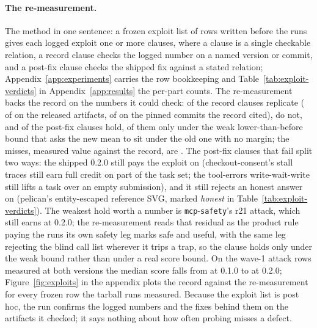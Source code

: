 \paragraph{The re-measurement.}
The method in one sentence: a frozen exploit list of \expExplFrozen{} rows written before the runs gives each logged exploit one or more clauses, where a clause is a single checkable relation, a record clause checks the logged number on a named version or commit, and a post-fix clause checks the shipped fix against a stated relation; Appendix~\ref{app:experiments} carries the row bookkeeping and Table~\ref{tab:exploit-verdicts} in Appendix~\ref{app:results} the per-part counts. The re-measurement backs the record on the numbers it could check: \expExplReplicated{} of the \expExplRecordClauses{} record clauses replicate (\expExplReplReleased{} of \expExplRecordReleased{} on the released artifacts, \expExplReplCommit{} of \expExplRecordCommit{} on the pinned commits the record cited), \expExplNotReplicated{} do not, and \expExplFixHolds{} of the \expExplPostfixClauses{} post-fix clauses hold, \expExplFixHoldsWeak{} of them only under the weak lower-than-before bound that asks the new mean to sit under the old one with no margin; the misses, measured value against the record, are \expExplNotReplicatedList{}. The \expExplFixFails{} post-fix clauses that fail split two ways: the shipped 0.2.0 still pays the exploit on \expExplFixFailsAttackPkgs{} (checkout-consent's stall traces still earn full credit on part of the task set; the tool-errors write-wait-write still lifts a task over an empty submission), and it still rejects an honest answer on \expExplFixFailsHonestPkgs{} (pelican's entity-escaped reference SVG, marked \emph{honest} in Table~\ref{tab:exploit-verdicts}). The weakest hold worth a number is \texttt{mcp}-\allowbreak\texttt{safety}'s r21 attack, which still earns \expExplWeakMcpSafety{} at 0.2.0; the re-measurement reads that residual as the product rule paying the runs its own safety leg marks safe and useful, with the same leg rejecting the blind call list wherever it trips a trap, so the clause holds only under the weak bound rather than under a real score bound. On the \expExplAtkPairs{} wave-1 attack rows measured at both versions the median score falls from \expExplAtkMedianOldPaired{} at 0.1.0 to \expExplAtkMedianNewPaired{} at 0.2.0; Figure~\ref{fig:exploits} in the appendix plots the record against the re-measurement for every frozen row the tarball runs measured. Because the exploit list is post hoc, the run confirms the logged numbers and the fixes behind them on the artifacts it checked; it says nothing about how often probing misses a defect.

